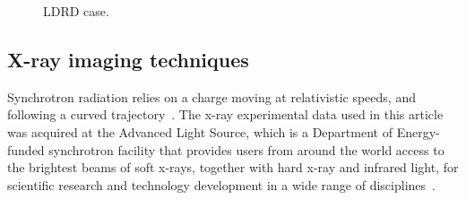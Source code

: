 \begin{figure}[!t]
\centering
{}
\hfil
{}
\caption{LDRD case.}
\label{fig:ldrd}
\end{figure}

\subsection{X-ray imaging techniques}


Synchrotron radiation relies on a charge moving at relativistic speeds, and following a curved trajectory~\cite{url:als:booklet}. The x-ray experimental data used in this article was acquired at the Advanced Light Source, which is a Department of Energy-funded synchrotron facility that provides users from around the world access to the brightest beams of soft x-rays, together with hard x-ray and infrared light, for scientific research and technology development in a wide range of disciplines~\cite{url:als}.

